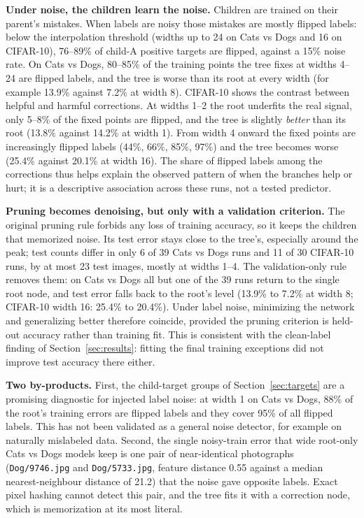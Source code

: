 \textbf{Under noise, the children learn the noise.} Children are trained on their parent's mistakes. When labels are noisy those mistakes are mostly flipped labels: below the interpolation threshold (widths up to 24 on Cats vs Dogs and 16 on CIFAR-10), 76--89\% of child-A positive targets are flipped, against a 15\% noise rate. On Cats vs Dogs, 80--85\% of the training points the tree fixes at widths 4--24 are flipped labels, and the tree is worse than its root at every width (for example 13.9\% against 7.2\% at width 8). CIFAR-10 shows the contrast between helpful and harmful corrections. At widths 1--2 the root underfits the real signal, only 5--8\% of the fixed points are flipped, and the tree is slightly \emph{better} than its root (13.8\% against 14.2\% at width 1). From width 4 onward the fixed points are increasingly flipped labels (44\%, 66\%, 85\%, 97\%) and the tree becomes worse (25.4\% against 20.1\% at width 16). The share of flipped labels among the corrections thus helps explain the observed pattern of when the branches help or hurt; it is a descriptive association across these runs, not a tested predictor.

\textbf{Pruning becomes denoising, but only with a validation criterion.} The original pruning rule forbids any loss of training accuracy, so it keeps the children that memorized noise. Its test error stays close to the tree's, especially around the peak; test counts differ in only 6 of 39 Cats vs Dogs runs and 11 of 30 CIFAR-10 runs, by at most 23 test images, mostly at widths 1--4. The validation-only rule removes them: on Cats vs Dogs all but one of the 39 runs return to the single root node, and test error falls back to the root's level (13.9\% to 7.2\% at width 8; CIFAR-10 width 16: 25.4\% to 20.4\%). Under label noise, minimizing the network and generalizing better therefore coincide, provided the pruning criterion is held-out accuracy rather than training fit. This is consistent with the clean-label finding of Section~\ref{sec:results}: fitting the final training exceptions did not improve test accuracy there either.

\textbf{Two by-products.} First, the child-target groups of Section~\ref{sec:targets} are a promising diagnostic for injected label noise: at width 1 on Cats vs Dogs, 88\% of the root's training errors are flipped labels and they cover 95\% of all flipped labels. This has not been validated as a general noise detector, for example on naturally mislabeled data. Second, the single noisy-train error that wide root-only Cats vs Dogs models keep is one pair of near-identical photographs (\texttt{Dog/9746.jpg} and \texttt{Dog/5733.jpg}, feature distance 0.55 against a median nearest-neighbour distance of 21.2) that the noise gave opposite labels. Exact pixel hashing cannot detect this pair, and the tree fits it with a correction node, which is memorization at its most literal.

